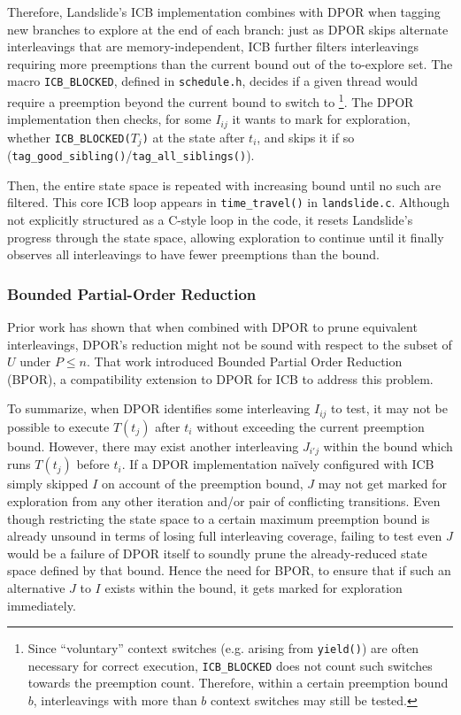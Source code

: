 Therefore, Landslide's ICB implementation combines with DPOR
when tagging new branches to explore at the end of each branch:
just as DPOR skips alternate interleavings that are memory-independent,
ICB further filters interleavings requiring more preemptions than the current bound
out of the to-explore set.
The macro {\tt ICB\_BLOCKED},
defined in {\tt schedule.h},
decides if a given thread would require a preemption beyond the current bound to switch to%
\footnote{Since ``voluntary'' context switches (e.g. arising from {\tt yield()})
are often necessary for correct execution,
{\tt ICB\_BLOCKED} does not count such switches towards the preemption count.
Therefore, within a certain preemption bound $b$,
interleavings with more than $b$ context switches may still be tested.
}.
The DPOR implementation then checks, for some $I_{ij}$ it wants to mark for exploration,
whether {\tt ICB\_BLOCKED(}$T_j${\tt )} at the state after $t_i$,
and skips it if so ({\tt tag\_good\_sibling()}/{\tt tag\_all\_siblings()}).

Then, the entire state space is repeated with increasing bound until no such are filtered.
This core ICB loop appears in {\tt time\_travel()} in {\tt landslide.c}.
Although not explicitly structured as a C-style loop in the code,
it resets Landslide's progress through the state space,
allowing exploration to continue until it finally observes all interleavings to have fewer preemptions than the bound.

\subsubsection{Bounded Partial-Order Reduction}

Prior work \cite{bpor} has shown that
when combined with DPOR to prune equivalent interleavings,
DPOR's reduction might not be sound with respect to the subset of $U$ under $P \le n$.
That work introduced Bounded Partial Order Reduction (BPOR),
a compatibility extension to DPOR for ICB to address this problem.

To summarize, when DPOR identifies some interleaving $I_{ij}$ to test,
it may not be possible to execute $T(t_j)$ after $t_i$ without exceeding the current preemption bound.
However, there may exist another interleaving $J_{i'j}$ within the bound which runs $T(t_j)$ before $t_i$.
If a DPOR implementation na\"ively configured with ICB simply skipped $I$ on account of the preemption bound,
$J$ may not get marked for exploration
from any other iteration and/or pair of conflicting transitions.
Even though restricting the state space to a certain maximum preemption bound is already unsound
in terms of losing full interleaving coverage,
failing to test even $J$ would be a failure of DPOR itself
to soundly prune the already-reduced state space defined by that bound.
Hence the need for BPOR, to ensure that if such an alternative $J$ to $I$ exists within the bound,
it gets marked for exploration immediately.

